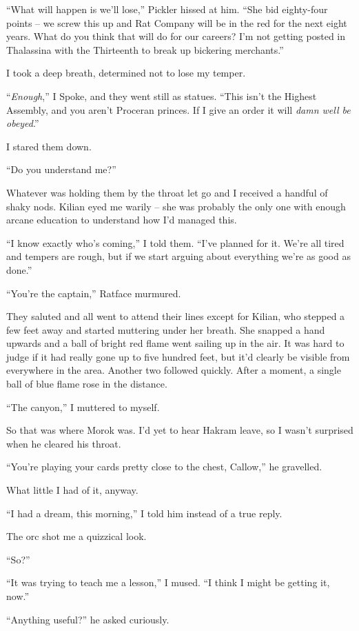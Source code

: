 \documentclass[12pt, openany]{book}
\begin{document}
“What will happen is we’ll lose,” Pickler hissed at him. “She bid eighty-four points – we screw this up and Rat Company will be in the red for the next eight years. What do you think that will do for our careers? I’m not getting posted in Thalassina with the Thirteenth to break up bickering merchants.”

I took a deep breath, determined not to lose my temper.

“\textit{Enough},” I Spoke, and they went still as statues. “This isn’t the Highest Assembly, and you aren’t Proceran princes. If I give an order it will \textit{damn well be obeyed}.”

I stared them down.

“Do you understand me?”

Whatever was holding them by the throat let go and I received a handful of shaky nods. Kilian eyed me warily – she was probably the only one with enough arcane education to understand how I’d managed this.

“I know exactly who’s coming,” I told them. “I’ve planned for it. We’re all tired and tempers are rough, but if we start arguing about everything we’re as good as done.”

“You’re the captain,” Ratface murmured.

They saluted and all went to attend their lines except for Kilian, who stepped a few feet away and started muttering under her breath. She snapped a hand upwards and a ball of bright red flame went sailing up in the air. It was hard to judge if it had really gone up to five hundred feet, but it’d clearly be visible from everywhere in the area. Another two followed quickly. After a moment, a single ball of blue flame rose in the distance.

“The canyon,” I muttered to myself. 

So that was where Morok was. I’d yet to hear Hakram leave, so I wasn’t surprised when he cleared his throat.

“You’re playing your cards pretty close to the chest, Callow,” he gravelled.

What little I had of it, anyway.

“I had a dream, this morning,” I told him instead of a true reply.

The orc shot me a quizzical look.

“So?”

“It was trying to teach me a lesson,” I mused. “I think I might be getting it, now.”

“Anything useful?” he asked curiously.
\end{document}
